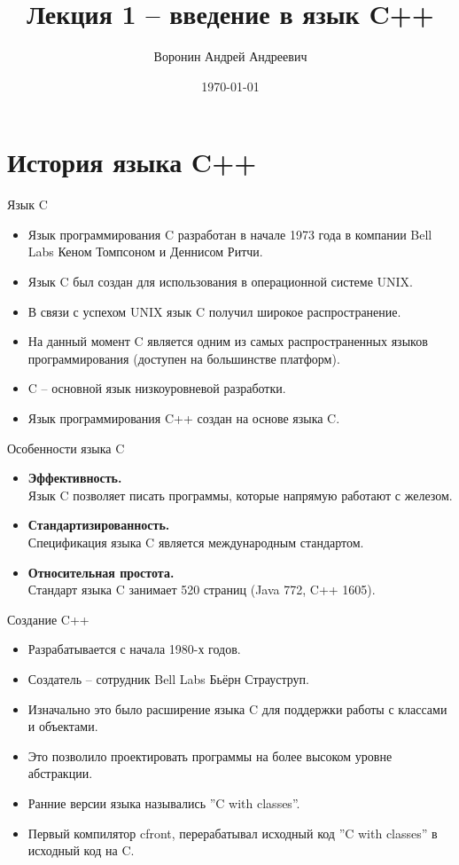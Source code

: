 \documentclass[9pt]{beamer}
\author{Воронин Андрей Андреевич}
\title{Лекция 1 – введение в язык C++}
\institute{Кафедра прикладной математики и информатики}
\date{\today}
\begin{document}
\titlepage 

\section{История языка C++}
\begin{frame}{Язык C}
    \begin{itemize}
        \item Язык программирования C разработан в начале 1973 года в
        компании Bell Labs Кеном Томпсоном и Деннисом Ритчи.
        \item Язык C был создан для использования в операционной
        системе UNIX.
        \item В связи с успехом UNIX язык C получил широкое
        распространение.
        \item На данный момент C является одним из самых
        распространенных языков программирования (доступен на
        большинстве платформ).
        \item C – основной язык низкоуровневой разработки.
        \item Язык программирования C++ создан на основе языка C.
    \end{itemize}
\end{frame}
\begin{frame}{Особенности языка C}
    \begin{itemize}
        \item \textbf{Эффективность.}\\
        Язык C позволяет писать программы, которые напрямую
        работают с железом.
        \item \textbf{Стандартизированность.}\\
        Спецификация языка C является международным
        стандартом.
        \item \textbf{Относительная простота.}\\
        Стандарт языка C занимает 520 страниц (Java 772, C++ 1605).
    \end{itemize}
\end{frame}
\begin{frame}{Создание C++}
    \begin{itemize}
        \item Разрабатывается с начала 1980-х годов.
        \item Создатель – сотрудник Bell Labs Бьёрн Страуструп.
        \item Изначально это было расширение языка C для поддержки
        работы с классами и объектами.
        \item Это позволило проектировать программы на более высоком
        уровне абстракции.
        \item Ранние версии языка назывались ”C with classes”.
        \item Первый компилятор cfront, перерабатывал исходный код ”C
        with classes” в исходный код на C.
    \end{itemize}
\end{frame}
\end{document}
